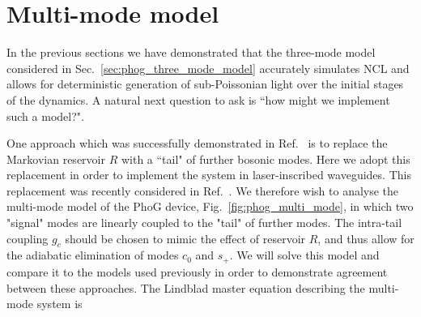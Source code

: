 



\section{Multi-mode model}\label{sec:phog_multi_mode}
In the previous sections we have demonstrated that the three-mode model considered in Sec.~\ref{sec:phog_three_mode_model} accurately simulates NCL and allows for deterministic generation of sub-Poissonian light over the initial stages of the dynamics. A natural next question to ask is ``how might we implement such a model?". %

One approach which was successfully demonstrated in Ref.~\cite{Mukherjee2017} is to replace the Markovian reservoir $R$ with a ``tail" of further bosonic modes. %
Here we adopt this replacement in order to implement the system in laser-inscribed waveguides. This replacement was recently considered in Ref.~\cite{Mukherjee2015, Mukherjee2017}. We therefore wish to analyse the multi-mode model of the PhoG device, Fig.~\ref{fig:phog_multi_mode}, in which two "signal" modes are linearly coupled to the "tail" of further modes. The intra-tail coupling $g_c$ should be chosen to mimic the effect of reservoir $R$, and thus allow for the adiabatic elimination of modes $c_0$ and $s_+$. We will solve this model and compare it to the models used previously in order to demonstrate agreement between these approaches. %
The Lindblad master equation describing the multi-mode system is

